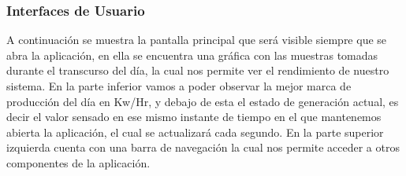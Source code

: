 \subsubsection{Interfaces de Usuario}\label{Interfaces de Usuario}

A continuación se muestra la pantalla principal que será visible siempre que se abra la aplicación, en ella se encuentra una gráfica con las muestras tomadas durante el transcurso del día, la cual nos permite ver el rendimiento de nuestro sistema. En la parte inferior vamos a poder observar la mejor marca de producción del día en Kw/Hr, y debajo de esta el estado de generación actual, es decir el valor sensado en ese mismo instante de tiempo en el que mantenemos abierta la aplicación, el cual se actualizará cada segundo. En la parte superior izquierda cuenta con una barra de navegación la cual nos permite acceder a otros componentes de la aplicación.  

